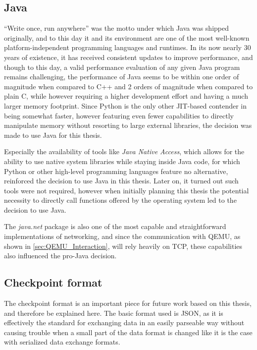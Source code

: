 \subsection{Java}
\enquote{Write once, run anywhere}\cite{WORA} was the motto under which Java was shipped originally,
and to this day it and its environment are one of the most well-known platform-independent
programming languages and runtimes.
In its now nearly 30 years of existence, it has received consistent updates to improve performance,
and though to this day, a valid performance evaluation of any given Java program remains challenging\cite{Java_Benchmarking},
the performance of Java seems to be within one order of magnitude when compared to C++ and 2 orders of magnitude when compared to plain C,
while however requiring a higher development effort and having a much larger memory footprint\cite{Java_Performance}.
Since Python is the only other JIT-based contender in \cite{Java_Performance} being somewhat faster,
however featuring even fewer capabilities to directly manipulate memory without
resorting to large external libraries, the decision was made to use Java for this thesis.

\label{JNA}
Especially the availability of tools like \emph{Java Native Access}\cite{JNA},
which allows for the ability to use native system libraries while staying inside Java code,
for which Python or other high-level programming languages feature no alternative,
reinforced the decision to use Java in this thesis.
Later on, it turned out such tools were not required, however when initially planning this thesis
the potential necessity to directly call functions offered by the operating system led to the decision to use Java.

The \emph{java.net} package is also one of the most capable and straightforward implementations of networking,
and since the communication with QEMU, as shown in \autoref{sec:QEMU_Interaction}, will rely heavily on TCP,
these capabilities also influenced the pro-Java decision.

\subsection{Checkpoint format}
The checkpoint format is an important piece for future work based on this thesis,
and therefore be explained here.
The basic format used is JSON, as it is effectively the standard for exchanging data
in an easily parseable way without causing trouble when a small part of the data format is changed
like it is the case with serialized data exchange formats.

